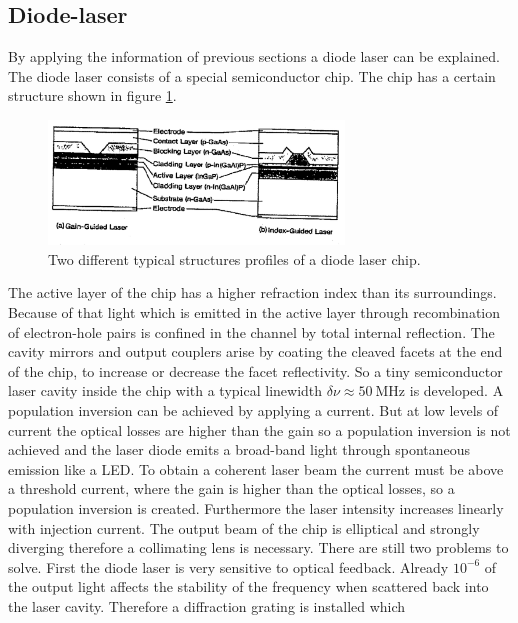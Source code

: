\subsection{Diode-laser}
\label{subsec:diodenlaser}
By applying the information of previous sections
a diode laser can be explained.
The diode laser consists of a special semiconductor chip.
The chip has a certain structure shown in figure \ref{fig:chip}.
\begin{figure}
  \centering
  \includegraphics[width=0.7\textwidth]{chip.png}
  \caption{Two different typical structures profiles of a diode laser chip.\cite{V60}}
  \label{fig:chip}
\end{figure}
The active layer of the chip has a higher refraction index than
its surroundings. Because of that light which is emitted
in the active layer through recombination of electron-hole pairs
is confined in the channel by total internal reflection.
The cavity mirrors and output couplers arise
by coating the cleaved facets at the end of the chip,
to increase or decrease the facet reflectivity.
So a tiny semiconductor laser cavity inside the chip
with a typical linewidth
$\delta \nu \approx \SI{50}{\mega\hertz}$
is developed.
A population inversion
can be achieved by applying a current.
But at low levels of current
the optical losses are higher than the gain
so a population inversion is not achieved and
the laser diode emits a broad-band light
through spontaneous emission
like a LED.
To obtain a coherent laser beam the current must be above
a threshold current, where the gain is higher than the
optical losses, so a population inversion is created.
Furthermore the laser intensity increases linearly with
injection current.
The output beam of the chip is elliptical and strongly diverging
therefore a collimating lens is necessary.
There are still two problems to solve.
First the diode laser is very sensitive to optical feedback.
Already $10^{-6}$ of the output light affects
the stability of the frequency
when scattered back into the
laser cavity.
Therefore a diffraction grating is installed which
